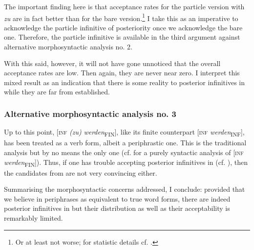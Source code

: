 \documentclass[output=paper,hidelinks]{langscibook}
\begin{document}
The important finding here is that acceptance rates for the particle version with \emph{zu} are in fact better than for the bare version.\footnote{Or at least not worse; for statistic details cf. \citet{Reiner2018}.}  I take this as an imperative to acknowledge the particle infinitive of posteriority once we acknowledge the bare one. Therefore, the particle infinitive is available in the third argument against alternative morphosyntactic analysis no. 2.

With this said, however, it will not have gone unnoticed that the overall acceptance rates are low. Then again, they are never near zero. I interpret this mixed result as an indication that there is some reality to posterior infinitives in  while they are far from established.

\subsubsection{Alternative morphosyntactic analysis no. 3}
Up to this point, [\textsc{inf} \emph{(zu)} \textit{werden}\textsubscript{FIN}], like its finite counterpart [\textsc{inf} \textit{werden}\textsubscript{INF}], has been treated as a verb form, albeit a periphrastic one. This is the traditional analysis but by no means the only one (cf. \citealt[][241–246]{Müller2013} for a purely syntactic analysis of [\textsc{inf} \textit{werden}\textsubscript{FIN}]). Thus, if one has trouble accepting posterior infinitives in  (cf. ), then the candidates from  are not very convincing either.

Summarising the morphosyntactic concerns addressed, I conclude: provided that we believe in periphrases as equivalent to true word forms, there are indeed posterior infinitives in  but their distribution as well as their acceptability is remarkably limited.
\end{document}
